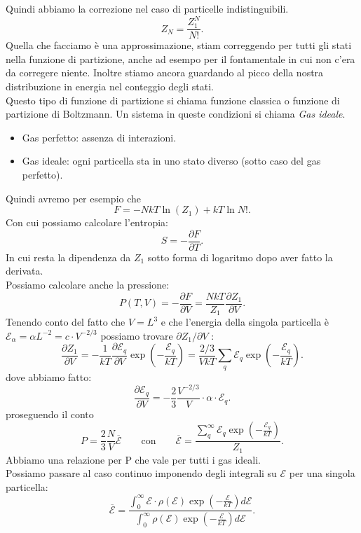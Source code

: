 Quindi abbiamo la correzione nel caso di particelle indistinguibili.
\[
	Z_{N} = \frac{Z_1^{N}}{N!}
.\] 
Quella che facciamo è una approssimazione, stiam correggendo per tutti gli stati nella funzione di partizione, anche ad esempo per il fontamentale in cui non c'era da corregere niente. Inoltre stiamo ancora guardando al picco della nostra distribuzione in energia nel conteggio degli stati.\\
Questo tipo di funzione di partizione si chiama funzione classica o funzione di partizione di Boltzmann. Un sistema in queste condizioni si chiama \textit{Gas ideale}.
\begin{itemize}
	\item Gas perfetto: assenza di interazioni.
	\item Gas ideale: ogni particella sta in uno stato diverso (sotto caso del gas perfetto).
\end{itemize} \label{def:gas-ideale}
Quindi avremo per esempio che
\[
	F = -NkT \ln \left( Z_1 \right) + kT \ln N!
.\] 
Con cui possiamo calcolare l'entropia:
\[
	S = - \frac{\partial F}{\partial T} 
.\] 
In cui resta la dipendenza da $Z_1$ sotto forma di logaritmo dopo aver fatto la derivata.\\
Possiamo calcolare anche la pressione:
\[
	P\left( T,V \right) = - \frac{\partial F}{\partial V} = \frac{NkT}{Z_1} \frac{\partial Z_1}{\partial V} 
.\] 
Tenendo conto del fatto che $V = L^3$ e che l'energia della singola particella è $\mathcal{E}_{\alpha}= \alpha L^{-2} = c \cdot V^{-2 /3}$ possiamo trovare $\partial Z_1 /\partial V $ :
\[
	\frac{\partial Z_1}{\partial V}  = - \frac{1}{kT} \frac{\partial \mathcal{E}_{q}}{\partial V} \exp\left( - \frac{\mathcal{E}_{q}}{kT} \right) = 
	\frac{2 /3}{VkT} \sum_{q}^{} \mathcal{E}_{q}\exp\left( -\frac{\mathcal{E}_{q}}{kT} \right) 
.\] 
dove abbiamo fatto:
\[
	\frac{\partial \mathcal{E}_{q}}{\partial V} = -\frac{2}{3}\frac{V^{-2 /3}}{V}\cdot \alpha\cdot  \mathcal{E}_{q}
.\] 
proseguendo il conto
\[
	P = \frac{2}{3}\frac{N}{V}\overline{\mathcal{E}} \quad \quad \text{con} \quad \quad \overline{\mathcal{E}} = \frac{\sum_{q}^{\infty} \mathcal{E}_{q}\exp\left( - \frac{\mathcal{E}_{q}}{kT} \right) }{Z_1}
.\] 
Abbiamo una relazione per P che vale per tutti i gas ideali.\\
Possiamo passare al caso continuo  imponendo degli integrali su $\mathcal{E}$ per una singola particella:
\[
	\overline{\mathcal{E}} = \frac{\int_{0}^{\infty} \mathcal{E}\cdot  \rho\left( \mathcal{E} \right) \exp\left( -\frac{\mathcal{E}}{kT} \right) d\mathcal{E}}{\int_{0}^{\infty}\rho\left( \mathcal{E} \right) \exp \left( -\frac{\mathcal{E}}{kT} \right) d\mathcal{E}}
.\] 

